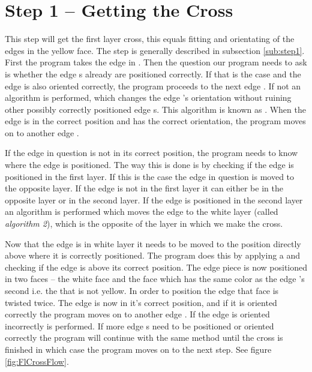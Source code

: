 \section{Step 1 -- Getting the Cross}
This step will get the first layer cross, this equals fitting and orientating of the edges in the yellow face. 
The step is generally described in subsection \ref{sub:step1}.
First the program takes the edge \cubie{} in \cubicle{} .
Then the question our program needs to ask is whether the edge \cpiece{}s already are positioned correctly.
If that is the case and the edge \cpiece{} is also oriented correctly, the program proceeds to the next edge \cpiece{}.
If not an algorithm is performed, which changes the edge \cpiece{}'s orientation without ruining other possibly correctly positioned edge \cpiece{}s. 
This algorithm is known as . When the edge \cpiece{} is in the correct position and has the correct orientation, the program moves on to another edge \cpiece{}. 

If the edge \cpiece{} in question is not in its correct position, the program needs to know where the edge is positioned. 
The way this is done is by checking if the edge \cpiece{} is positioned in the first layer. 
If this is the case the edge \cpiece{} in question is moved to the opposite layer. 
If the edge \cpiece{} is not in the first layer it can either be in the opposite layer or in the second layer.
If the edge \cpiece{} is positioned in the second layer an algorithm is performed which moves the edge \cpiece{} to the white layer (called \textit{algorithm 2}), which is the opposite of the layer in which we make the cross.

Now that the edge \cpiece{} is in white layer it needs to be moved to the position directly above where it is correctly positioned. 
The program does this by applying a  \twist{} and checking if the edge \cpiece{} is above its correct position.
The edge piece is now positioned in two faces -- the white face and the face which has the same color as the edge  \cpiece{}'s second \facelet{} i.e. the \facelet{} that is not yellow.
In order to position the edge \cpiece{} that face is twisted twice.
The edge \cpiece{} is now in it's correct position, and if it is oriented correctly the program moves on to another edge  \cpiece{} .
If the edge \cpiece{} is oriented incorrectly  is performed. If more edge \cpiece{}s need to be positioned or oriented correctly the program will continue with the same method until the cross is finished in which case the program moves on to the next step. See figure \ref{fig:FlCrossFlow}.

